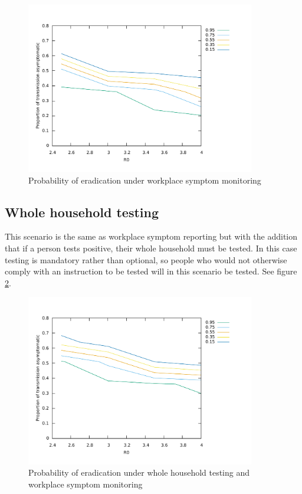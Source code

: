 \documentclass{article}
\begin{document}
\begin{figure}
\begin{center}
\includegraphics[width = 10cm]{workplaceSymptomMonitoring.pdf}
\end{center}
\caption{Probability of eradication under workplace symptom monitoring}
\label{workplaceSymptom}
\end{figure}

\subsection{Whole household testing}

This scenario is the same as workplace symptom reporting but with the addition that if a person tests positive, their whole household must be tested. In this case testing is mandatory rather than optional, so people who would not otherwise comply with an instruction to be tested will in this scenario be tested. See figure \ref{householdAndWorkplaceSymptom}.

\begin{figure}
\begin{center}
\includegraphics[width = 10cm]{householdEnforcement.pdf}
\end{center}
\caption{Probability of eradication under whole household testing and workplace symptom monitoring}
\label{householdAndWorkplaceSymptom}
\end{figure}
\end{document}

